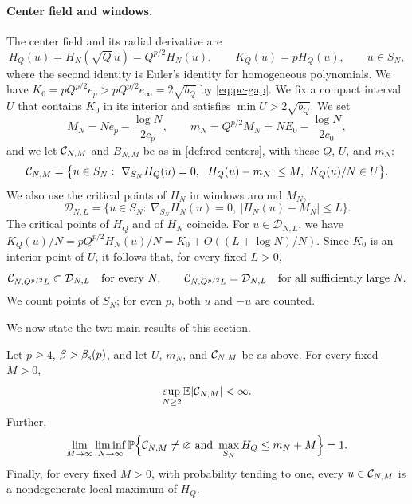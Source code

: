\paragraph{Center field and windows.}
The center field and its radial derivative are
\[
H_Q(u)=H_N(\sqrt Q\,u)=Q^{p/2}H_N(u),\qquad K_Q(u)=pH_Q(u),\qquad u\in S_N,
\]
where the second identity is Euler's identity for homogeneous polynomials. We have $K_0=pQ^{p/2}e_p>pQ^{p/2}e_\infty=2\sqrt{b_Q}$ by \eqref{eq:pc-gap}. We fix a compact interval $U$ that contains $K_0$ in its interior and satisfies $\min U>2\sqrt{b_Q}$. We set
\begin{equation}\label{eq:pc-centering}
M_N=Ne_p-\frac{\log N}{2c_p},\qquad m_N=Q^{p/2}M_N=NE_0-\frac{\log N}{2c_0},
\end{equation}
and we let $\mathcal C_{N,M}$ and $B_{N,M}$ be as in \cref{def:red-centers}, with these $Q$, $U$, and $m_N$:
\[
\cC_{N,M}=\bigl\{u\in S_N:\ \nabla_{S_N}H_Q(u)=0,\ |H_Q(u)-m_N|\le M,\ K_Q(u)/N\in U\bigr\}.
\]
We also use the critical points of $H_N$ in windows around $M_N$,
\[
\mathcal D_{N,L}=\bigl\{u\in S_N:\ \nabla_{S_N}H_N(u)=0,\ |H_N(u)-M_N|\le L\bigr\}.
\]
The critical points of $H_Q$ and of $H_N$ coincide. For $u\in\mathcal D_{N,L}$, we have $K_Q(u)/N=pQ^{p/2}H_N(u)/N=K_0+O((L+\log N)/N)$. Since $K_0$ is an interior point of $U$, it follows that, for every fixed $L>0$,
\begin{equation}\label{eq:pc-window}
\mathcal C_{N,Q^{p/2}L}\subset\mathcal D_{N,L}\quad\text{for every }N,\qquad \mathcal C_{N,Q^{p/2}L}=\mathcal D_{N,L}\quad\text{for all sufficiently large }N.
\end{equation}
We count points of $S_N$; for even $p$, both $u$ and $-u$ are counted.

We now state the two main results of this section.

\begin{proposition}\label{prop:pc-counts}
Let $p\ge4$, $\beta>\beta_{\mathrm s}(p)$, and let $U$, $m_N$, and $\mathcal C_{N,M}$ be as above. For every fixed $M>0$,
\begin{equation}\label{eq:pc-count}
\sup_{N\ge2}\mathbb E|\mathcal C_{N,M}|<\infty.
\end{equation}
Further,
\begin{equation}\label{eq:pc-ground}
\lim_{M\to\infty}\liminf_{N\to\infty}\Pp\Bigl\{\cC_{N,M}\ne\varnothing\ \text{and}\ \max_{S_N}H_Q\le m_N+M\Bigr\}=1.
\end{equation}
Finally, for every fixed $M>0$, with probability tending to one, every $u\in\mathcal C_{N,M}$ is a nondegenerate local maximum of $H_Q$.
\end{proposition}

